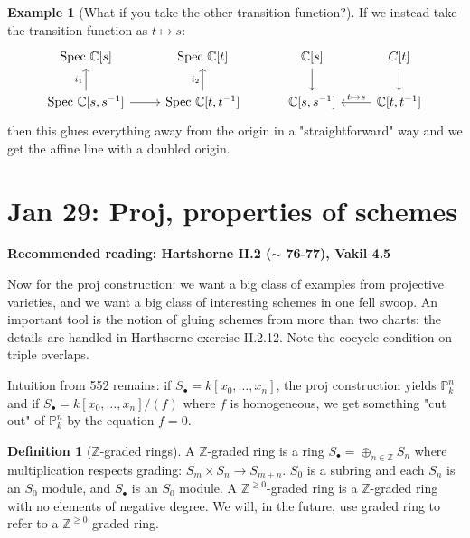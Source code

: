 \documentclass[10pt,reqno]{amsart}
\theoremstyle{definition}
\newtheorem{example}[theorem]{Example}
\newtheorem{definition}[theorem]{Definition}
\theoremstyle{remark}
\numberwithin{equation}{section}
\numberwithin{theorem}{section}
\newcommand{\C}{{\mathbb C}}
\newcommand{\Z}{{\mathbb Z}}
\newcommand{\spec}{\textup{Spec }}
\newcommand{\PP}{{\mathbb P}}
\begin{document}
\begin{example}[What if you take the other transition function?] If we instead take the transition function as $t \mapsto s$:
\[\begin{tikzcd}
\spec \C[s] & \spec \C[t]\\
\spec \C[s,s^{-1}] \arrow[u,"i_1"] \arrow[r]& \spec \C[t,t^{-1}] \arrow[u,"i_2"]
\end{tikzcd} \quad \quad \quad
\begin{tikzcd}
\C[s] \arrow[d]& C[t] \arrow[d] \\
\C[s,s^{-1}] &  \C[t,t^{-1}] \arrow[l, swap, "t \mapsto s"] 
\end{tikzcd}\]
then this glues everything away from the origin in a "straightforward" way and we get the affine line with a doubled origin.
\end{example}
\section{Jan 29: Proj, properties of schemes}
\textbf{Recommended reading: Hartshorne II.2 ($\sim$ 76-77), Vakil 4.5}

Now for the proj construction: we want a big class of examples from projective varieties, and we want a big class of interesting schemes in one fell swoop. An important tool is the notion of gluing schemes from more than two charts: the details are handled in Harthsorne exercise II.2.12. Note the cocycle condition on triple overlaps.

Intuition from 552 remains: if $S_{\bullet} = k[x_0,\dots,x_n]$, the proj construction yields $\PP^n_k$ and if $S_{\bullet} = k[x_0,\dots,x_n]/(f)$ where $f$ is homogeneous, we get something "cut out" of $\PP^n_k$ by the equation $f = 0$.

\begin{definition}[$\Z$-graded rings] A $\Z$-graded ring is a ring $S_{\bullet} = \oplus_{n \in \Z} S_n$ where multiplication respects grading: $S_m \times S_n \to S_{m+n}$. $S_0$ is a subring and each $S_n$ is an $S_0$ module, and $S_{\bullet}$ is an $S_0$ module. A $\Z^{\ge 0}$-graded ring is a $\Z$-graded ring with no elements of negative degree. We will, in the future, use graded ring to refer to a $\Z^{\ge 0}$ graded ring.
\end{definition}
\end{document}

